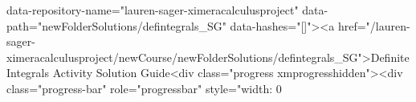 data-repository-name="lauren-sager-ximeracalculusproject" data-path="newFolderSolutions/defintegrals_SG" data-hashes="[]"><a href="/lauren-sager-ximeracalculusproject/newCourse/newFolderSolutions/defintegrals_SG">Definite Integrals Activity Solution Guide<div class="progress xmprogresshidden"><div class="progress-bar" role="progressbar" style="width: 0%